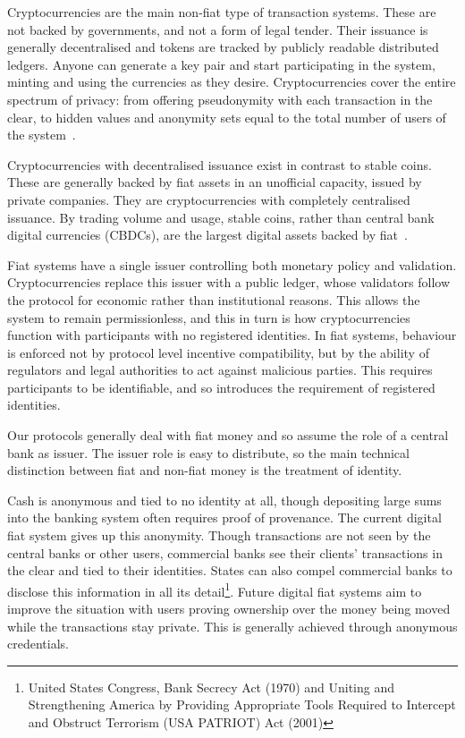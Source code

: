 Cryptocurrencies are the main non-fiat type of transaction systems. These are
not backed by governments, and not a form of legal tender. Their issuance is
generally decentralised and tokens are tracked by publicly readable distributed
ledgers. Anyone can generate a key pair and start participating in the system,
minting and using the currencies as they desire. Cryptocurrencies cover the
entire spectrum of privacy: from offering pseudonymity with each transaction in
the clear, to hidden values and anonymity sets equal to the total number of
users of the system~\cite{bitcoin,ethereum,EPRINT:Noether15,SP:BCGGMT14}.

Cryptocurrencies with decentralised issuance exist in contrast to stable coins.
These are generally backed by fiat assets in an unofficial capacity, issued by
private companies. They are cryptocurrencies with completely centralised
issuance. By trading volume and usage, stable coins, rather than central bank
digital currencies (CBDCs), are the largest digital assets backed by
fiat~\cite{BIS26stablecoins}.

Fiat systems have a single issuer controlling both monetary policy and validation.
Cryptocurrencies replace this issuer with a public ledger, whose validators follow
the protocol for economic rather than institutional reasons. This allows the system
to remain permissionless, and this in turn is how cryptocurrencies function with 
participants with no registered identities. In fiat systems, behaviour is enforced 
not by protocol level incentive compatibility, but by the ability of regulators and
legal authorities to act against malicious parties. This requires participants to be
identifiable, and so introduces the requirement of registered identities.

Our protocols generally deal with fiat money and so assume the role of a
central bank as issuer. The issuer role is easy to distribute, so the main
technical distinction between fiat and non-fiat money is the treatment
of identity.

Cash is anonymous and tied to no identity at all, though depositing large sums
into the banking system often requires proof of provenance. The current digital
fiat system gives up this anonymity. Though transactions are not seen by the
central banks or other users, commercial banks see their clients' transactions
in the clear and tied to their identities. States can also compel commercial
banks to disclose this information in all its detail\footnote{United States
Congress, Bank Secrecy Act (1970) and Uniting and Strengthening America by
Providing Appropriate Tools Required to Intercept and Obstruct Terrorism (USA
PATRIOT) Act (2001)}.  Future digital fiat systems aim to improve the situation
with users proving ownership over the money being moved while the transactions
stay private. This is generally achieved through anonymous credentials.

